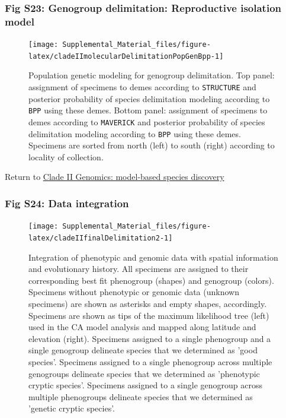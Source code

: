 \documentclass[
  11pt,
]{article}
\begin{document}
\hypertarget{fig-s23-genogroup-delimitation-reproductive-isolation-model}{%
\subsubsection{Fig S23: Genogroup delimitation: Reproductive isolation model}\label{fig-s23-genogroup-delimitation-reproductive-isolation-model}}

\begin{figure}
\texttt{[image: Supplemental\_Material\_files/figure-latex/cladeIImolecularDelimitationPopGenBpp-1]} \caption{Population genetic modeling for genogroup delimitation. Top panel: assignment of specimens to demes according to \texttt{STRUCTURE} and posterior probability of species delimitation modeling according to \texttt{BPP} using these demes. Bottom panel: assignment of specimens to demes according to \texttt{MAVERICK} and posterior probability of species delimitation modeling according to \texttt{BPP} using these demes. Specimens are sorted from north (left) to south (right) according to locality of collection.}\label{fig:cladeIImolecularDelimitationPopGenBpp}
\end{figure}

Return to \protect\hyperlink{model-based-species-discovery-3}{Clade II Genomics: model-based species discovery}
\pagebreak

\hypertarget{fig-s24-data-integration}{%
\subsubsection{Fig S24: Data integration}\label{fig-s24-data-integration}}

\begin{figure}
\texttt{[image: Supplemental\_Material\_files/figure-latex/cladeIIfinalDelimitation2-1]} \caption{Integration of phenotypic and genomic data with spatial information and evolutionary history. All specimens are assigned to their corresponding best fit phenogroup (shapes) and genogroup (colors). Specimens without phenotypic or genomic data (unknown specimens) are shown as asterisks and empty shapes, accordingly. Specimens are shown as tips of the maximum likelihood tree (left) used in the CA model analysis and mapped along latitude and elevation (right). Specimens assigned to a single phenogroup and a single genogroup delineate species that we determined as 'good species'. Specimens assigned to a single phenogroup across multiple genogroups delineate species that we determined as 'phenotypic cryptic species'. Specimens assigned to a single genogroup across multiple phenogroups delineate species that we determined as 'genetic cryptic species'.}\label{fig:cladeIIfinalDelimitation2}
\end{figure}
\end{document}
